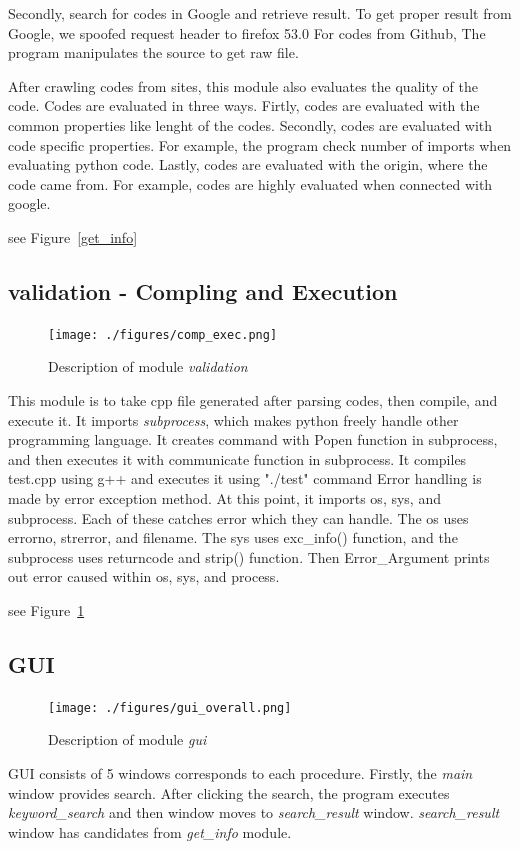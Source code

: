 \documentclass[conference]{IEEEtran}
\begin{document}
Secondly, search for codes in Google and retrieve result.
To get proper result from Google, we spoofed request header to firefox 53.0
For codes from Github, The program manipulates the source to get raw file.

After crawling codes from sites, this module also evaluates the quality of the code.
Codes are evaluated in three ways.
Firtly, codes are evaluated with the common properties like lenght of the codes.
Secondly, codes are evaluated with code specific properties. 
For example, the program check number of imports when evaluating python code.
Lastly, codes are evaluated with the origin, where the code came from.
For example, codes are highly evaluated when connected with google.

see Figure~\ref{get_info}

\subsection{validation - Compling and Execution} %
\label{sub:validation}

\label{sub:validation}
\begin{figure}[ht]
\centering
\texttt{[image: ./figures/comp\_exec.png]}
\caption{Description of module \textit{validation}}
\label{validation}
\end{figure}
This module is to take cpp file generated after parsing codes, then compile, and execute it.
It imports \textit{subprocess}, which makes python freely handle other programming language.
It creates command with Popen function in subprocess, and then executes it with communicate function in subprocess.
It compiles test.cpp using g++ and executes it using "./test" command
Error handling is made by error exception method. 
At this point, it imports os, sys, and subprocess. 
Each of these catches error which they can handle.
The os uses errorno, strerror, and filename.
The sys uses exc\_info() function, and the subprocess uses returncode and strip() function.
Then Error\_Argument prints out error caused within os, sys, and process.

see Figure~\ref{validation}

\subsection{GUI} %
\label{sub:gui}
\begin{figure}[ht]
\centering
\texttt{[image: ./figures/gui\_overall.png]}
\caption{Description of module \textit{gui}}
\label{gui}
\end{figure}
GUI consists of 5 windows corresponds to each procedure.
Firstly, the \textit{main} window provides search.
After clicking the search, the program executes \textit{keyword\_search} and then window moves to \textit{search\_result} window.
\textit{search\_result} window has candidates from \textit{get\_info} module.
\end{document}

